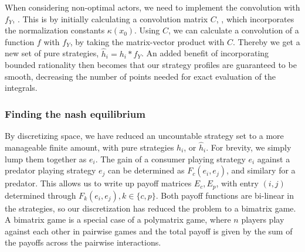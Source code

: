 When considering non-optimal actors, we need to implement the convolution with $f_Y$, . This is by initially calculating a convolution matrix $C$, \citep{}, which incorporates the normalization constants $\kappa(x_0)$. Using $C$, we can calculate a convolution of a function $f$ with $f_Y$,  by taking the matrix-vector product with $C$. Thereby we get a new set of pure strategies, $\hat{h}_i = h_i * f_Y$.
An added benefit of incorporating bounded rationality then becomes that our strategy profiles are guaranteed to be smooth, decreasing the number of points needed for exact evaluation of the integrals.


\subsubsection*{Finding the nash equilibrium}
By discretizing space, we have reduced an uncountable strategy set to a more manageable finite amount, with pure strategies $h_i$, or $\hat{h}_i$. For brevity, we simply lump them together as $e_i$. The gain of a consumer playing strategy $e_i$ against a predator playing strategy $e_j$ can be determined as $F_c(e_i,e_j)$, and similary for a predator. This allows us to write up payoff matrices $E_c, E_p$, with entry $(i,j)$ determined through $F_k(e_i,e_j), k \in \{c, p\}$.  Both payoff functions are bi-linear in the strategies, so our discretization has reduced the problem to a bimatrix game. A bimatrix game is a special case of a polymatrix game, where $n$ players play against each other in pairwise games and the total payoff is given by the sum of the payoffs across the pairwise interactions. %



